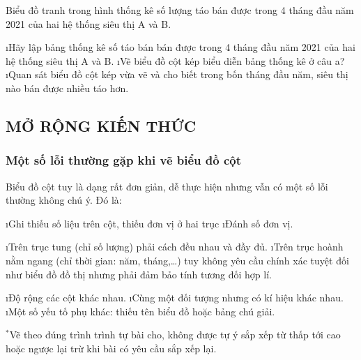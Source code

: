 \begin{vd}
	Biểu đồ tranh trong hình thống kê số lượng táo bán được trong 4 tháng đầu năm 2021 của hai hệ thống siêu thị A và B.
%	
%	
	
	\begin{enumerate}[a),leftmargin=*]
		\i Hãy lập bảng thống kê số táo bán bán được trong 4 tháng đầu năm 2021 của hai hệ thống siêu thị A và B.
		\i Vẽ biểu đồ cột kép biểu diễn bảng thống kê ở câu a?
		\i Quan sát biểu đồ cột kép vừa vẽ và cho biết trong bốn tháng đầu năm, siêu thị nào bán được nhiều táo hơn.
	\end{enumerate}
\end{vd}
\subsection{MỞ RỘNG KIẾN THỨC}
\subsubsection*{Một số lỗi thường gặp khi vẽ biểu đồ cột}
Biểu đồ cột tuy là dạng rất đơn giản, dễ thực hiện nhưng vẫn có một số lỗi thường không chú ý. Đó là:
\begin{enumerate}[--,leftmargin=*]
	\i Ghi thiếu số liệu trên cột, thiếu đơn vị ở hai trục
	\i Đánh số đơn vị.
	\begin{enumerate}[+,leftmargin=*]
		\i Trên trục tung (chỉ số lượng) phải cách đều nhau và đầy đủ.
		\i Trên trục hoành nằm ngang (chỉ thời gian: năm, tháng,\ldots) tuy  không yêu cầu chính xác tuyệt đối như biểu đồ đồ thị nhưng phải đảm bảo tính tương đối hợp lí.
	\end{enumerate}
	\i Độ rộng các cột khác nhau.
	\i Cùng một đối tượng nhưng có kí hiệu khác nhau.
	\i Một số yếu tố phụ khác: thiếu tên biểu đồ hoặc bảng chú giải.
\end{enumerate}
$^*$Vẽ theo đúng trình trình tự bài cho, không được tự ý sắp xếp từ thấp tới cao hoặc ngược lại trừ khi bài có yêu  cầu sắp xếp lại.
